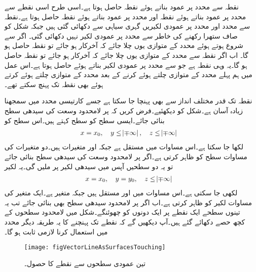  نقطہ  سے  محدد پر عمود بناتے ہوئے نقطہ   حاصل ہوتا ہے۔اسی طرح اسی نقطے سے  محدد پر عمود بناتے ہوئے نقطہ   اور  محدد پر عمود بناتے ہوئے نقطہ  حاصل ہوتا ہے۔نقطہ  سے  محدد اور  محدد پر عمودی لکیریں گہری سیاہی سے دکھائی گئی ہیں جبکہ شکل کو صاف ستھرا رکھنے کی خاطر  سے  محدد پر عمودی لکیر نہیں دکھائی گئی۔ اگر  سے  شروع ہوتے ہوئے  محدد کے متوازی یوں چلا جائے کہ آخرکار  ہو جائے تو نقطہ  حاصل ہو گا۔ اب اگر نقطہ  سے  محدد کے متوازی یوں چلا جائے کہ آخرکار  ہو جائے تو نقطہ  حاصل ہو گا۔یہ وہی نقطہ ہے جو  سے  محدد پر عمودی لکیر بناتے ہوئے حاصل ہوتا ہے۔اس عمل میں ہم پہلے  محدد کے متوازی چلتے ہوئے  کرنے کے بعد  محدد کے متوازی چلتے ہوئے  کرتے ہوئے بھی نقطہ  تک پہنچ سکتے تھے۔

نقطہ  تک قدر مختلف انداز سے بھی پہنچا جا سکتا ہے جسے کارتیسی محدد میں سمجھنا زیادہ آسان ہے۔شکل  کو دیکھئیے۔فرض کریں کہ  پر لامحدود وسعت کی  سیدھی سطح بنائی جائے۔ایسی سطح کو  سطح  کہتے ہیں۔اس سطح کو
\begin{align*}
x=x_0, \quad  y\le \abs{\mp \infty}, \quad z \le \abs{\mp \infty}
\end{align*} 
لکھا جا سکتا ہے۔اس مساوات میں  مستقل ہے جبکہ  اور  متغیرات ہیں۔دو متغیرات کی مساوات سطح کو ظاہر کرتی ہے۔اگر  پر لامحدود وسعت کی  سیدھی سطح بنائی جائے تو یہ دو سطحیں  آپس میں سیدھی لکیر پر ملیں گی۔یہ لکیر
\begin{align*}
x=x_0, \quad  y=y_0, \quad z \le \abs{\mp \infty}
\end{align*} 
لکھی جا سکتی ہے۔اس مساوات میں  اور  مستقل ہیں جبکہ  متغیر ہے۔ایک متغیر کی مساوات لکیر کو ظاہر کرتی ہے۔اب اگر  پر لامحدود  سیدھی سطح بھی بنائی جائے تب یہ تینوں سطحے ایک نقطے  پر ایک دونوں کو چھوئنگے۔شکل  میں  لامحدود سطحوں کے کچھ حصے دکھائے گئے ہیں۔آپ دیکھیں گے کہ نقطے تک پہنچنے کا یہ طریقہ دیگر محدد میں استعمال کرنا لازمی ثابت ہو گا۔
\begin{figure}
\centering
\texttt{[image: figVectorLineAsSurfacesTouching]}
\caption{تین عمودی سطحوں سے نقطے کا حصول۔}
\label{شکل_سمتیہ_تین_عمودی_سطحوں_سے_نقطہ}
\end{figure}

